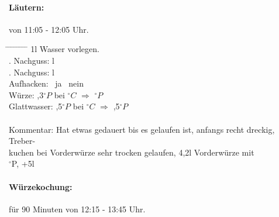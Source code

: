 \documentclass[12pt,oneside,a4paper]{scrartcl}
\begin{document}
{\paragraph{Läutern:} von 11:05 - 12:05 Uhr.
	\begin{tabbing}
		\hspace{1cm} \= \hspace{1cm} \= \hspace{1cm} \= \hspace{1cm} \= \hspace{1cm} \=\hspace{1cm} \=\hspace{1cm} \=\hspace{1cm} \= \kill
		\> 1l Wasser vorlegen.\\
		\> . Nachguss: \> \> 7 l\\
		\> . Nachguss: \> \> 5 l\\
		\> \> \> Aufhacken: \> \> \Square \ ja \> \> \Square \ nein\\
		\> Würze: \> \> ,3$^\circ P$ \> bei $^\circ C$ \> $\Rightarrow$ $^\circ P$\\
		\> Glattwasser: \> \> ,5$^\circ P$ \> bei $^\circ C$ \> $\Rightarrow$ ,5$^\circ P$\\\\
		\> Kommentar: \>\>\> Hat etwas gedauert bis es gelaufen ist, anfangs recht dreckig, Treber-\\
		\>\>\>\>kuchen bei Vorderwürze sehr trocken gelaufen, 4,2l Vorderwürze mit\\
		\>\>\>$^\circ$P, +5l\\
	\end{tabbing}
%
\paragraph{Würzekochung:} für 90 Minuten von 12:15 - 13:45 Uhr.\\
}
\end{document}

